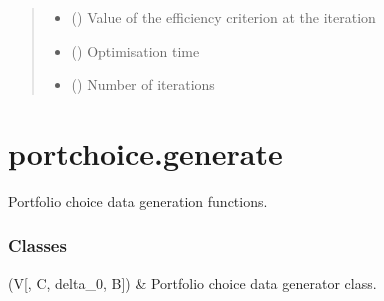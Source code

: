 \documentclass[a4paper,10pt,english]{sphinxhowto}
\begin{document}
\begin{fulllineitems}
\begin{fulllineitems}
\begin{quote}
\begin{description}
\begin{itemize}
\item {} 
\sphinxAtStartPar
{} () \textendash{} Value of the efficiency criterion at the  iteration

\item {} 
\sphinxAtStartPar
{} () \textendash{} Optimisation time

\item {} 
\sphinxAtStartPar
{} () \textendash{} Number of iterations

\end{itemize}


\end{description}\end{quote}

\end{fulllineitems}


\end{fulllineitems}


\sphinxstepscope


\section{portchoice.generate}
\label{\detokenize{generated/portchoice.generate:module-portchoice.generate}}\label{\detokenize{generated/portchoice.generate:portchoice-generate}}\label{\detokenize{generated/portchoice.generate::doc}}
\sphinxAtStartPar
Portfolio choice data generation functions.
\subsubsection*{Classes}


\begin{savenotes}\sphinxattablestart
\sphinxthistablewithglobalstyle
\sphinxthistablewithnovlinesstyle
\centering
\begin{tabulary}{\linewidth}[t]{}
\sphinxtoprule
\sphinxtableatstartofbodyhook
\sphinxAtStartPar
{\hyperref[\detokenize{generated/portchoice.generate:portchoice.generate.PortGen}]{}}(V{[}, C, delta\_0, B{]})
&
\sphinxAtStartPar
Portfolio choice data generator class.
\\
\sphinxbottomrule
\end{tabulary}
\sphinxtableafterendhook\par
\sphinxattableend\end{savenotes}
\end{document}

